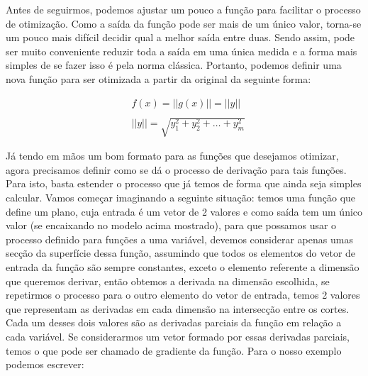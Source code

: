Antes de seguirmos, podemos ajustar um pouco a função para facilitar o
processo de otimização. Como a saída da função pode ser mais de um único valor,
torna-se um pouco mais difícil decidir qual a melhor saída entre duas. Sendo
assim, pode ser muito conveniente reduzir toda a saída em uma única medida e a
forma mais simples de se fazer isso é pela norma clássica. Portanto, podemos
definir uma nova função para ser otimizada a partir da original da seguinte
forma:


\begin{equation}
    \begin{array}{ccc}
        &   f(x) = ||g(x)|| = ||y||\\
        &\\
        &   ||y|| = \sqrt{ y_1^2 + y_2^2 + \hdots + y_m^2}
    \end{array}
\end{equation}

Já tendo em mãos um bom formato para as funções que desejamos otimizar, agora
precisamos definir como se dá o processo de derivação para tais funções. Para
isto, basta estender o processo que já temos de forma que ainda seja simples
calcular. Vamos começar imaginando a seguinte situação: temos uma função que
define um plano, cuja entrada é um vetor de 2 valores e como saída tem um único
valor (se encaixando no modelo acima mostrado), para que possamos usar o processo
definido para funções a uma variável, devemos considerar apenas umas secção da
superfície dessa função, assumindo que todos os elementos do vetor de entrada
da função são sempre constantes, exceto o elemento referente a dimensão que
queremos derivar, então obtemos a derivada na dimensão escolhida, se repetirmos
o processo para o outro elemento do vetor de entrada, temos 2 valores que
representam as derivadas em cada dimensão na intersecção entre os cortes.
Cada um desses dois valores são as derivadas parciais da função em relação a
cada variável. Se considerarmos um vetor formado por essas derivadas parciais,
temos o que pode ser chamado de gradiente da função. Para o nosso exemplo
podemos escrever:

